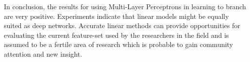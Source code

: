 In conclusion, the results for using Multi-Layer Perceptrons in learning to branch are very positive. Experiments indicate that linear models might be equally suited as deep networks. Accurate linear methods can provide opportunities for evaluating the current feature-set used by the researchers in the field and is assumed to be a fertile area of research which is probable to gain community attention and new insight.    


